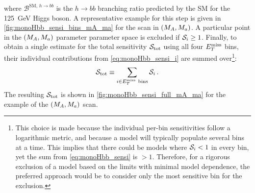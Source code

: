 where $\mathcal{B}^{\mathrm{SM},\,h\to bb}$ is the $h\to bb$ branching ratio predicted by the SM for the 125~GeV Higgs boson. A representative example for this step is given in \autoref{fig:monoHbb_sensi_bins_mA_ma} for the scan in $(M_{A},M_{a})$.  A particular point in the $(M_{A},M_{a})$ parameter parameter space is excluded if $\mathcal{S}_i \geq 1$. Finally, to obtain a single estimate for the total sensitivity $\mathcal{S}_\textrm{tot}$ using all four $E_T^\mathrm{miss}$ bins, their individual contributions from \autoref{eq:monoHbb_sensi_i} are summed over\footnote{
This choice is made because the individual per-bin sensitivities follow a logarithmic metric, and because a model will typically populate several \met bins at a time. This implies that there could be models where $\mathcal{S}_i<1$ in every bin, yet the sum from \autoref{eq:monoHbb_sensi} is $>1$.
Therefore, for a rigorous exclusion of a model based on the limits with minimal model dependence, the preferred approach would be to consider only the most sensitive bin for the exclusion.
}:
\begin{equation}
\label{eq:monoHbb_sensi}
\mathcal{S}_\textrm{tot} \equiv \sum_{i\in E_T^\mathrm{miss}~\mathrm{bins}} \mathcal{S}_i\,.
\end{equation}
The resulting $\mathcal{S}_\textrm{tot}$ is shown in \autoref{fig:monoHbb_sensi_full_mA_ma} for the example of the $(M_{A},M_{a})$ scan.


